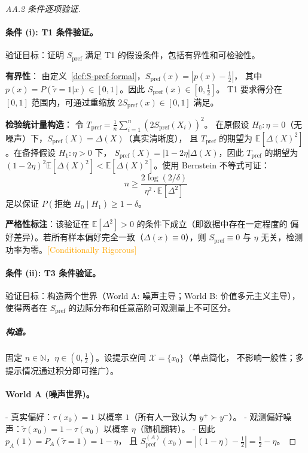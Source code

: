 \documentclass[12pt,a4paper]{article}
\newcommand{\conditionallyrigorous}{\textcolor{orange}{\small\textsf{[Conditionally Rigorous]}}}
\newcommand{\N}{\mathbb{N}}
\newcommand{\E}{\mathbb{E}}
\newcommand{\cX}{\mathcal{X}}
\begin{document}
\begin{proof}[AA.2 条件逐项验证]

\paragraph{条件 (i): T1 条件验证。}

验证目标：证明 $S_{\mathrm{pref}}$ 满足 T1 的假设条件，包括有界性和可检验性。

\textbf{有界性}：
由定义~\ref{def:S-pref-formal}，$S_{\mathrm{pref}}(x) = |p(x) - \frac12|$，
其中 $p(x)=P(\tilde{\tau}=1|x)\in[0,1]$。因此 $S_{\mathrm{pref}}(x)\in[0,\frac12]$。
T1 要求得分在 $[0,1]$ 范围内，可通过重缩放 $2S_{\mathrm{pref}}(x)\in[0,1]$ 满足。

\textbf{检验统计量构造}：
令 $T_{\mathrm{pref}} = \frac{1}{n}\sum_{i=1}^n (2S_{\mathrm{pref}}(X_i))^2$。
在原假设 $H_0:\eta=0$（无噪声）下，$S_{\mathrm{pref}}(X) = \Delta(X)$（真实清晰度），
且 $T_{\mathrm{pref}}$ 的期望为 $\E[\Delta(X)^2]$。在备择假设 $H_1:\eta>0$ 下，
$S_{\mathrm{pref}}(X) = |1-2\eta|\Delta(X)$，因此 $T_{\mathrm{pref}}$ 的期望为
$(1-2\eta)^2\E[\Delta(X)^2] < \E[\Delta(X)^2]$。使用 Bernstein 不等式可证：
\[
n \geq \frac{2\log(2/\delta)}{\eta^2 \cdot \E[\Delta^2]}
\]
足以保证 $P(\text{拒绝 }H_0\mid H_1) \geq 1-\delta$。

\textbf{严格性标注}：该验证在 $\E[\Delta^2]>0$ 的条件下成立（即数据中存在一定程度的
偏好差异）。若所有样本偏好完全一致（$\Delta(x)\equiv0$），则 $S_{\mathrm{pref}}\equiv0$
与 $\eta$ 无关，检测功率为零。\conditionallyrigorous

\paragraph{条件 (ii): T3 条件验证。}

验证目标：构造两个世界（World A: 噪声主导；World B: 价值多元主义主导），
使得两者在 $S_{\mathrm{pref}}$ 的边际分布和任意高阶可观测量上不可区分。

\subparagraph{构造。}
固定 $n\in\N$，$\eta\in(0,\frac12)$。设提示空间 $\cX = \{x_0\}$（单点简化，
不影响一般性；多提示情况通过积分即可推广）。

\paragraph{World A (噪声世界)。}
- 真实偏好：$\tau(x_0) = 1$ 以概率 $1$（所有人一致认为 $y^+\succ y^-$）。
- 观测偏好噪声：$\tilde{\tau}(x_0) = 1-\tau(x_0)$ 以概率 $\eta$（随机翻转）。
- 因此 $p_A(1) = P_A(\tilde{\tau}=1) = 1-\eta$，
  且 $S_{\mathrm{pref}}^{(A)}(x_0) = |(1-\eta)-\frac12| = \frac12 - \eta$。


\end{proof}
\end{document}
